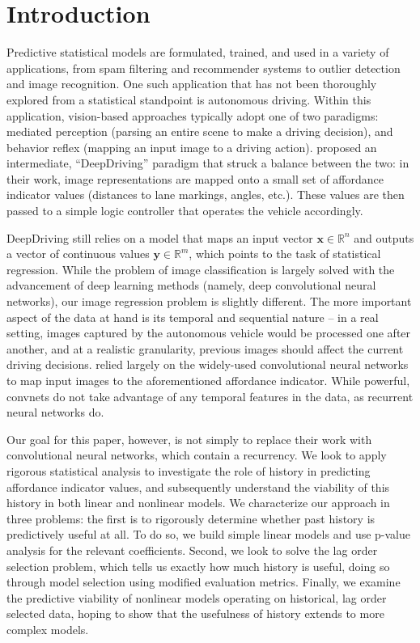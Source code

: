 \documentclass[11pt]{article}
\begin{document}
\section{Introduction}\label{intro}
Predictive statistical models are formulated, trained, and used in a variety of applications, from spam filtering and recommender systems to outlier detection and image recognition.  One such application that has not been thoroughly explored from a statistical standpoint is autonomous driving.  Within this application, vision-based approaches typically adopt one of two paradigms: mediated perception (parsing an entire scene to make a driving decision), and behavior reflex (mapping an input image to a driving action).  \cite{deepdriving} proposed an intermediate, ``DeepDriving'' paradigm that struck a balance between the two: in their work, image representations are mapped onto a small set of affordance indicator values (distances to lane markings, angles, etc.).  These values are then passed to a simple logic controller that operates the vehicle accordingly.\par
DeepDriving still relies on a model that maps an input vector $\mathbf{x} \in \mathbb{R}^n$ and outputs a vector of continuous values $\mathbf{y} \in \mathbb{R}^m$, which points to the task of statistical regression.  While the problem of image classification is largely solved with the advancement of deep learning methods (namely, deep convolutional neural networks), our image regression problem is slightly different.  The more important aspect of the data at hand is its temporal and sequential nature -- in a real setting, images captured by the autonomous vehicle would be processed one after another, and at a realistic granularity, previous images should affect the current driving decisions.  \cite{deepdriving} relied largely on the widely-used convolutional neural networks to map input images to the aforementioned affordance indicator.  While powerful, convnets do not take advantage of any temporal features in the data, as recurrent neural networks do.\par
Our goal for this paper, however, is not simply to replace their work with convolutional neural networks, which contain a recurrency.  We look to apply rigorous statistical analysis to investigate the role of history in predicting affordance indicator values, and subsequently understand the viability of this history in both linear and nonlinear models.  We characterize our approach in three problems: the first is to rigorously determine whether past history is predictively useful at all.  To do so, we build simple linear models and use p-value analysis for the relevant coefficients.  Second, we look to solve the lag order selection problem, which tells us exactly how much history is useful, doing so through model selection using modified evaluation metrics.  Finally, we examine the predictive viability of nonlinear models operating on historical, lag order selected data, hoping to show that the usefulness of history extends to more complex models.\par
\end{document}
